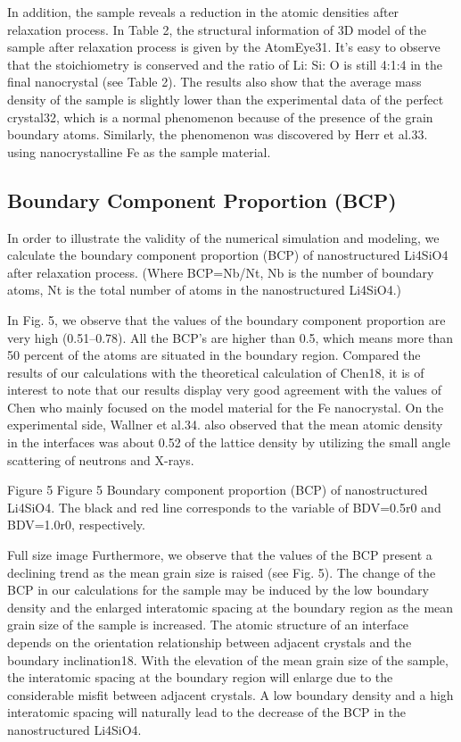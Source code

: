 \documentclass{article}
\begin{document}
In addition, the sample reveals a reduction in the atomic densities after relaxation process. In Table 2, the structural information of 3D model of the sample after relaxation process is given by the AtomEye31. It’s easy to observe that the stoichiometry is conserved and the ratio of Li: Si: O is still 4:1:4 in the final nanocrystal (see Table 2). The results also show that the average mass density of the sample is slightly lower than the experimental data of the perfect crystal32, which is a normal phenomenon because of the presence of the grain boundary atoms. Similarly, the phenomenon was discovered by Herr et al.33. using nanocrystalline Fe as the sample material.


\subsection{Boundary Component Proportion (BCP)}

In order to illustrate the validity of the numerical simulation and modeling, we calculate the boundary component proportion (BCP) of nanostructured Li4SiO4 after relaxation process. (Where BCP=Nb/Nt, Nb is the number of boundary atoms, Nt is the total number of atoms in the nanostructured Li4SiO4.)

In Fig. 5, we observe that the values of the boundary component proportion are very high (0.51–0.78). All the BCP’s are higher than 0.5, which means more than 50 percent of the atoms are situated in the boundary region. Compared the results of our calculations with the theoretical calculation of Chen18, it is of interest to note that our results display very good agreement with the values of Chen who mainly focused on the model material for the Fe nanocrystal. On the experimental side, Wallner et al.34. also observed that the mean atomic density in the interfaces was about 0.52 of the lattice density by utilizing the small angle scattering of neutrons and X-rays.

Figure 5
Figure 5
Boundary component proportion (BCP) of nanostructured Li4SiO4. The black and red line corresponds to the variable of BDV=0.5r0 and BDV=1.0r0, respectively.

Full size image
Furthermore, we observe that the values of the BCP present a declining trend as the mean grain size is raised (see Fig. 5). The change of the BCP in our calculations for the sample may be induced by the low boundary density and the enlarged interatomic spacing at the boundary region as the mean grain size of the sample is increased. The atomic structure of an interface depends on the orientation relationship between adjacent crystals and the boundary inclination18. With the elevation of the mean grain size of the sample, the interatomic spacing at the boundary region will enlarge due to the considerable misfit between adjacent crystals. A low boundary density and a high interatomic spacing will naturally lead to the decrease of the BCP in the nanostructured Li4SiO4.
\end{document}
